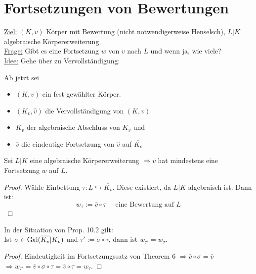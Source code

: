 
\section{Fortsetzungen von Bewertungen}

\underline{Ziel:} $(K,v)$ Körper mit Bewertung (nicht notwendigerweise Henselsch), $L|K$ algebraische Körpererweiterung.\\
\underline{Frage:} Gibt es eine Fortsetzung $w$ von $v$ nach $L$ und wenn ja, wie viele?\\
\underline{Idee:} Gehe über zu Vervollständigung:

\begin{Not}
Ab jetzt sei
\begin{itemize}
\item $(K,v)$ ein fest gewählter Körper.
\item $(K_v, \hat{v})$ die Vervollständigung von $(K,v)$
\item $\overline{K_v}$ der algebraische Abschluss von $K_v$ und
\item $\overline{v}$ die eindeutige Fortsetzung von $\hat{v}$ auf $\overline{K_v}$
\end{itemize}
\end{Not}

\begin{Prop}
Sei $L|K$ eine algebraische Körpererweiterung $\Rightarrow v$ hat mindestens eine Fortsetzung $w$ auf $L$.
\end{Prop}

\begin{proof}
Wähle Einbettung $\tau: L \hookrightarrow \overline{K_v}$. Diese existiert, da $L|K$ algebraisch ist. Dann ist:
\[ w_\tau := \overline{v} \circ \tau \quad \text{ eine Bewertung auf } L\]
\end{proof}

\begin{Bem}
In der Situation von Prop. 10.2 gilt:\\
Ist $\sigma \in \operatorname{Gal}(\overline{K_v}|K_v)$ und $\tau':=\sigma \circ \tau$, dann ist $w_{\tau'}=w_\tau$.
\end{Bem}

\begin{proof}
Eindeutigkeit im Fortsetzungssatz von Theorem 6 $\Rightarrow \overline{v} \circ \sigma = \overline{v}$
$\Rightarrow w_{\tau'} = \overline{v} \circ \sigma \circ \tau = \overline{v} \circ \tau = w_\tau$.
\end{proof}

